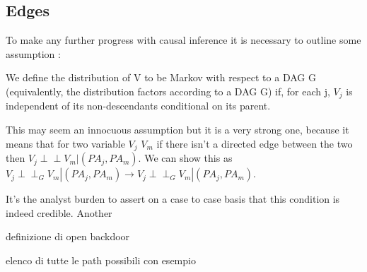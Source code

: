 %
\subsection{Edges}
To make any further progress with causal inference it is necessary to outline some assumption  \citep{hernan2020causal}: 
\begin{ass}
We define the distribution of V to be Markov with respect to a DAG G (equivalently, the distribution factors according to a DAG G) if, for each j, $V_j$ is independent of its non-descendants conditional on its parent.
\end{ass}
This may seem an innocuous assumption but it is a very strong one, because it means that for two variable $V_j$ $V_m$ if there isn't a directed edge between the two then $V_j \perp\!\!\!\perp V_m | (PA_j, PA_m)$.
We can show this as $V_j \perp\!\!\!\perp _G V_m | (PA_j, PA_m) \rightarrow V_j \perp\!\!\!\perp _G V_m | (PA_j, PA_m)$.

 It's the analyst burden to assert on a case to case basis that this condition  is indeed credible.
Another 


definizione di open backdoor 

elenco di tutte le path possibili  con esempio




